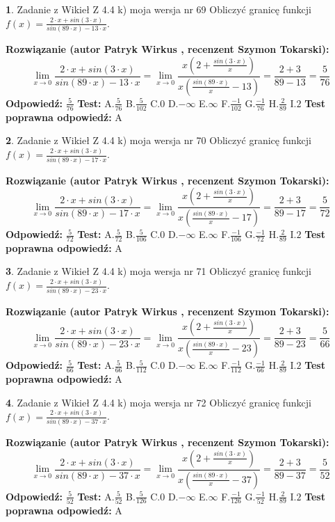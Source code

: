 \documentclass[12pt, a4paper]{article}
\theoremstyle{definition} %
\newtheorem{zad}{}
\newcommand{\zadStart}[1]{\begin{zad}#1\newline}
\newcommand{\zadStop}{\end{zad}}
\newcommand{\rozwStart}[2]{\noindent \textbf{Rozwiązanie (autor #1 , recenzent #2): }\newline}
\newcommand{\rozwStop}{\newline}
\newcommand{\odpStart}{\noindent \textbf{Odpowiedź:}\newline}
\newcommand{\odpStop}{\newline}
\newcommand{\testStart}{\noindent \textbf{Test:}\newline}
\newcommand{\testStop}{\newline}
\newcommand{\kluczStart}{\noindent \textbf{Test poprawna odpowiedź:}\newline}
\newcommand{\kluczStop}{\newline}
\begin{document}
\zadStart{Zadanie z Wikieł Z 4.4 k) moja wersja nr 69}
Obliczyć granicę funkcji $f(x)=\frac{2\cdot x +sin(3\cdot x)}{sin(89\cdot x) -13\cdot x}$.
\zadStop
\rozwStart{Patryk Wirkus}{Szymon Tokarski}
$$\lim\limits_{x\to 0}\frac{2\cdot x +sin(3\cdot x)}{sin(89\cdot x) -13\cdot x}
=\lim\limits_{x\to 0}\frac{x(2+\frac{sin(3\cdot x)}{x})}{x(\frac{sin(89\cdot x)}{x}-13)}
=\frac{2+3}{89-13} = \frac{5}{76}$$
\rozwStop
\odpStart
$\frac{5}{76}$
\odpStop
\testStart
A.$\frac{5}{76}$
B.$\frac{5}{102}$
C.$0$
D.$-\infty$
E.$\infty$
F.$\frac{-1}{102}$
G.$\frac{-1}{76}$
H.$\frac{2}{89}$
I.$2$
\testStop
\kluczStart
A
\kluczStop



\zadStart{Zadanie z Wikieł Z 4.4 k) moja wersja nr 70}
Obliczyć granicę funkcji $f(x)=\frac{2\cdot x +sin(3\cdot x)}{sin(89\cdot x) -17\cdot x}$.
\zadStop
\rozwStart{Patryk Wirkus}{Szymon Tokarski}
$$\lim\limits_{x\to 0}\frac{2\cdot x +sin(3\cdot x)}{sin(89\cdot x) -17\cdot x}
=\lim\limits_{x\to 0}\frac{x(2+\frac{sin(3\cdot x)}{x})}{x(\frac{sin(89\cdot x)}{x}-17)}
=\frac{2+3}{89-17} = \frac{5}{72}$$
\rozwStop
\odpStart
$\frac{5}{72}$
\odpStop
\testStart
A.$\frac{5}{72}$
B.$\frac{5}{106}$
C.$0$
D.$-\infty$
E.$\infty$
F.$\frac{-1}{106}$
G.$\frac{-1}{72}$
H.$\frac{2}{89}$
I.$2$
\testStop
\kluczStart
A
\kluczStop



\zadStart{Zadanie z Wikieł Z 4.4 k) moja wersja nr 71}
Obliczyć granicę funkcji $f(x)=\frac{2\cdot x +sin(3\cdot x)}{sin(89\cdot x) -23\cdot x}$.
\zadStop
\rozwStart{Patryk Wirkus}{Szymon Tokarski}
$$\lim\limits_{x\to 0}\frac{2\cdot x +sin(3\cdot x)}{sin(89\cdot x) -23\cdot x}
=\lim\limits_{x\to 0}\frac{x(2+\frac{sin(3\cdot x)}{x})}{x(\frac{sin(89\cdot x)}{x}-23)}
=\frac{2+3}{89-23} = \frac{5}{66}$$
\rozwStop
\odpStart
$\frac{5}{66}$
\odpStop
\testStart
A.$\frac{5}{66}$
B.$\frac{5}{112}$
C.$0$
D.$-\infty$
E.$\infty$
F.$\frac{-1}{112}$
G.$\frac{-1}{66}$
H.$\frac{2}{89}$
I.$2$
\testStop
\kluczStart
A
\kluczStop



\zadStart{Zadanie z Wikieł Z 4.4 k) moja wersja nr 72}
Obliczyć granicę funkcji $f(x)=\frac{2\cdot x +sin(3\cdot x)}{sin(89\cdot x) -37\cdot x}$.
\zadStop
\rozwStart{Patryk Wirkus}{Szymon Tokarski}
$$\lim\limits_{x\to 0}\frac{2\cdot x +sin(3\cdot x)}{sin(89\cdot x) -37\cdot x}
=\lim\limits_{x\to 0}\frac{x(2+\frac{sin(3\cdot x)}{x})}{x(\frac{sin(89\cdot x)}{x}-37)}
=\frac{2+3}{89-37} = \frac{5}{52}$$
\rozwStop
\odpStart
$\frac{5}{52}$
\odpStop
\testStart
A.$\frac{5}{52}$
B.$\frac{5}{126}$
C.$0$
D.$-\infty$
E.$\infty$
F.$\frac{-1}{126}$
G.$\frac{-1}{52}$
H.$\frac{2}{89}$
I.$2$
\testStop
\kluczStart
A
\kluczStop
\end{document}
